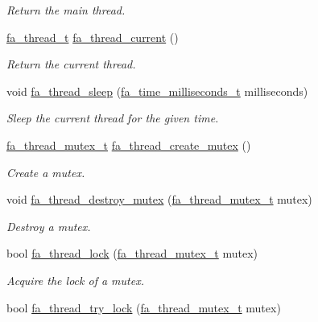 \begin{DoxyCompactItemize}
\begin{DoxyCompactList}\small\item\em Return the main thread. \end{DoxyCompactList}\item 
\hyperlink{group___fa_thread_gaec6debf84c8113cb354a7352b4e17abd}{fa\-\_\-thread\-\_\-t} \hyperlink{group___fa_thread_ga1fb7335a50aa9eea5c096c33fd6baec0}{fa\-\_\-thread\-\_\-current} ()
\begin{DoxyCompactList}\small\item\em Return the current thread. \end{DoxyCompactList}\item 
void \hyperlink{group___fa_thread_ga6a6c70317be48603d0316bdb93914f5f}{fa\-\_\-thread\-\_\-sleep} (\hyperlink{group___fa_time_gadebdebeab6c5ba7cd8002d0773635e61}{fa\-\_\-time\-\_\-milliseconds\-\_\-t} milliseconds)
\begin{DoxyCompactList}\small\item\em Sleep the current thread for the given time. \end{DoxyCompactList}\item 
\hyperlink{group___fa_thread_ga659c355795f6866eec71ecd8eeadbd59}{fa\-\_\-thread\-\_\-mutex\-\_\-t} \hyperlink{group___fa_thread_ga06266c98c357794d97111b15b6a8257c}{fa\-\_\-thread\-\_\-create\-\_\-mutex} ()
\begin{DoxyCompactList}\small\item\em Create a mutex. \end{DoxyCompactList}\item 
void \hyperlink{group___fa_thread_ga42acc6681b419516e0ab1e62af7bb0bc}{fa\-\_\-thread\-\_\-destroy\-\_\-mutex} (\hyperlink{group___fa_thread_ga659c355795f6866eec71ecd8eeadbd59}{fa\-\_\-thread\-\_\-mutex\-\_\-t} mutex)
\begin{DoxyCompactList}\small\item\em Destroy a mutex. \end{DoxyCompactList}\item 
bool \hyperlink{group___fa_thread_ga7b5b662a66628e354da65a8a79e15b0a}{fa\-\_\-thread\-\_\-lock} (\hyperlink{group___fa_thread_ga659c355795f6866eec71ecd8eeadbd59}{fa\-\_\-thread\-\_\-mutex\-\_\-t} mutex)
\begin{DoxyCompactList}\small\item\em Acquire the lock of a mutex. \end{DoxyCompactList}\item 
bool \hyperlink{group___fa_thread_ga5992bc1e6c5715264629a552519252b5}{fa\-\_\-thread\-\_\-try\-\_\-lock} (\hyperlink{group___fa_thread_ga659c355795f6866eec71ecd8eeadbd59}{fa\-\_\-thread\-\_\-mutex\-\_\-t} mutex)

\end{DoxyCompactItemize}
